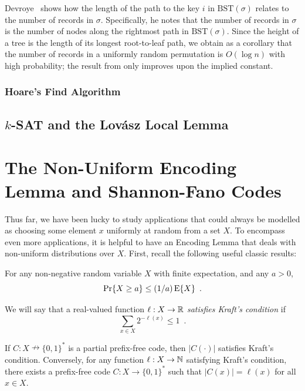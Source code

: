 \documentclass{patmorin}
\begin{document}
\begin{rem}
  Devroye~\cite{devroye:records} shows how the length of the path to
  the key $i$ in $\text{BST}(\sigma)$ relates to the number of records
  in $\sigma$. Specifically, he notes that the number of records in
  $\sigma$ is the number of nodes along the rightmost path in
  $\text{BST}(\sigma)$. Since the height of a tree is the length of
  its longest root-to-leaf path, we obtain as a corollary that the
  number of records in a uniformly random permutation is $O(\log n)$
  with high probability; the result from  only
  improves upon the implied constant.
\end{rem}

\subsubsection{Hoare's Find Algorithm}

\subsection{$k$-SAT and the Lov\'{a}sz Local Lemma}

\section{The Non-Uniform Encoding Lemma and Shannon-Fano Codes}

Thus far, we have been lucky to study applications that could always
be modelled as choosing some element $x$ uniformly at random from a
set $X$. To encompass even more applications, it is helpful to have an
Encoding Lemma that deals with non-uniform distributions over $X$. First, recall the following useful classic results:
\begin{thm}
For any non-negative random variable $X$ with finite expectation, and any $a > 0$,
\[
\Pr\{X \geq a\} \leq (1/a) \operatorname{\mathrm{E}}\{X\} \enspace .
\]
\end{thm}

We will say that a real-valued function $\ell : X \to \mathbb{R}$ \emph{satisfies Kraft's condition} if
\[
\sum_{x \in X} 2^{-\ell(x)} \leq 1 \enspace .
\]
\begin{lem}
If $C : X \nrightarrow \{0,1\}^*$ is a partial prefix-free code, then $|C(\cdot)|$ satisfies Kraft's condition. Conversely, for any function $\ell : X \to \mathbb{N}$ satisfying Kraft's condition, there exists a prefix-free code $C : X \to \{0, 1\}^*$ such that $|C(x)| = \ell(x)$ for all $x \in X$.
\end{lem}
\end{document}
